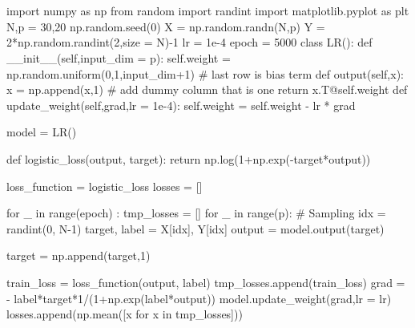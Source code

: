 \documentclass[10pt]{article}
\begin{document}
\section{}
\begin{python}
import numpy as np
from random import randint
import matplotlib.pyplot as plt
N,p = 30,20
np.random.seed(0)
X = np.random.randn(N,p)
Y = 2*np.random.randint(2,size = N)-1
lr = 1e-4
epoch = 5000
class LR():
    def __init__(self,input_dim = p):
        self.weight = np.random.uniform(0,1,input_dim+1) # last row is bias term
    def output(self,x):
        x = np.append(x,1) # add dummy column that is one
        return x.T@self.weight
    def update_weight(self,grad,lr = 1e-4):
        self.weight = self.weight - lr * grad

model = LR()

def logistic_loss(output, target):
    return np.log(1+np.exp(-target*output))

loss_function = logistic_loss                                                   
losses = []

for _ in range(epoch) :
    tmp_losses = []
    for _ in range(p):
        # Sampling
        idx = randint(0, N-1)
        target, label = X[idx], Y[idx]
        output = model.output(target)

        target = np.append(target,1)
        
        train_loss = loss_function(output, label)
        tmp_losses.append(train_loss)
        grad = - label*target*1/(1+np.exp(label*output))
        model.update_weight(grad,lr = lr)
    losses.append(np.mean([x for x in tmp_losses]))
\end{python}
\end{document}
